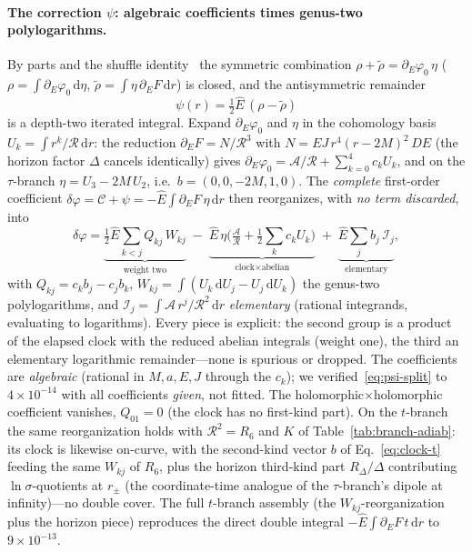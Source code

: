 \documentclass[12pt]{iopart}
\newcommand{\Ehat}{\hat E}
\newcommand{\dd}{\mathrm{d}}
\begin{document}
\paragraph{The correction $\psi$: algebraic coefficients times genus-two
polylogarithms.} By parts and the shuffle identity~\cite{Chen1977} the symmetric
combination $\rho+\tilde\rho=\partial_E\varphi_0\,\eta$
($\rho=\int\partial_E\varphi_0\,\dd\eta$,
$\tilde\rho=\int\eta\,\partial_E F\,\dd r$) is closed, and the antisymmetric
remainder
\begin{equation}
    \psi(r)=\tfrac12\Ehat\,(\rho-\tilde\rho)
    \label{eq:psi-irr}
\end{equation}
is a depth-two iterated integral. Expand $\partial_E\varphi_0$ and $\eta$ in the
cohomology basis $U_k=\int r^k/\mathcal{R}\,\dd r$: the reduction
$\partial_E F=N/\mathcal{R}^3$ with $N=EJ\,r^4(r-2M)^2\,DE$ (the horizon factor
$\Delta$ cancels identically) gives
$\partial_E\varphi_0=\mathcal{A}/\mathcal{R}+\sum_{k=0}^{4} c_k U_k$, and on the
$\tau$-branch $\eta=U_3-2M\,U_2$, i.e.\ $b=(0,0,-2M,1,0)$. The \emph{complete}
first-order coefficient $\delta\varphi=\mathcal{C}+\psi=-\Ehat\int\partial_E F\,
\eta\,\dd r$ then reorganizes, with \emph{no term discarded}, into
\begin{equation}
    \delta\varphi=
    \underbrace{\tfrac12\Ehat\!\sum_{k<j}Q_{kj}\,W_{kj}}_{\text{weight two}}
    \;-\;\underbrace{\Ehat\,\eta\Big(\tfrac{\mathcal{A}}{\mathcal{R}}
    +\tfrac12\!\sum_k c_k U_k\Big)}_{\text{clock}\times\text{abelian}}
    \;+\;\underbrace{\Ehat\!\sum_j b_j\,\mathcal{I}_j}_{\text{elementary}},
    \label{eq:psi-split}
\end{equation}
with $Q_{kj}=c_k b_j-c_j b_k$, $W_{kj}=\int(U_k\,\dd U_j-U_j\,\dd U_k)$ the
genus-two polylogarithms, and $\mathcal{I}_j=\int\mathcal{A}\,r^j/\mathcal{R}^2\,
\dd r$ \emph{elementary} (rational integrands, evaluating to logarithms). Every
piece is explicit: the second group is a product of the elapsed clock with the
reduced abelian integrals (weight one), the third an elementary logarithmic
remainder---none is spurious or dropped. The coefficients are \emph{algebraic}
(rational in $M,a,E,J$ through the $c_k$); we verified~\eqref{eq:psi-split} to
$4\times10^{-14}$ with all coefficients \emph{given}, not fitted. The
holomorphic$\times$holomorphic coefficient vanishes, $Q_{01}=0$ (the clock has no
first-kind part). On the $t$-branch the same reorganization holds with
$\mathcal{R}^2=R_6$ and $K$ of Table~\ref{tab:branch-adiab}: its clock is likewise
on-curve, with the second-kind vector $b$ of Eq.~\eqref{eq:clock-t} feeding the same
$W_{kj}$ of $R_6$, plus the horizon third-kind part $R_\Delta/\Delta$ contributing
$\ln\sigma$-quotients at $r_\pm$ (the coordinate-time analogue of the $\tau$-branch's
dipole at infinity)---no double cover. The full $t$-branch assembly (the
$W_{kj}$-reorganization plus the horizon piece) reproduces the direct double integral
$-\Ehat\!\int\!\partial_E F\,t\,\dd r$ to $9\times10^{-13}$.
\end{document}
